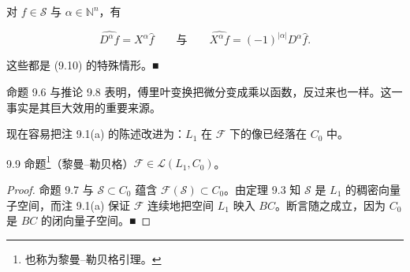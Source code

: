 \begin{corollary}

对 $ f \in \mathcal{S} $ 与 $ \alpha \in \mathbb{N}^n $，有

\[
\widehat{D^\alpha f} = X^\alpha\widehat{f} \qquad \text{与} \qquad \widehat{X^\alpha f} = (-1)^{|\alpha|}D^\alpha\widehat{f} .
\]

\proofhead
这些都是 (9.10) 的特殊情形。\nobreak\hspace{0.35em}■
\end{corollary}

命题 9.6 与推论 9.8 表明，傅里叶变换把微分变成乘以函数，反过来也一样。这一事实是其巨大效用的重要来源。

现在容易把注 9.1(a) 的陈述改进为：$ L_1 $ 在 $ \mathcal{F} $ 下的像已经落在 $ C_0 $ 中。

9.9 命题\footnote{也称为黎曼–勒贝格引理。}（黎曼–勒贝格）$ \mathcal{F} \in \mathcal{L}(L_1,C_0) $。

\begin{proof}

命题 9.7 与 $ \mathcal{S} \subset C_0 $ 蕴含 $ \mathcal{F}(\mathcal{S}) \subset C_0 $。由定理 9.3 知 $ \mathcal{S} $ 是 $ L_1 $ 的稠密向量子空间，而注 9.1(a) 保证 $ \mathcal{F} $ 连续地把空间 $ L_1 $ 映入 $ BC $。断言随之成立，因为 $ C_0 $ 是 $ BC $ 的闭向量子空间。\nobreak\hspace{0.35em}■

\end{proof}

